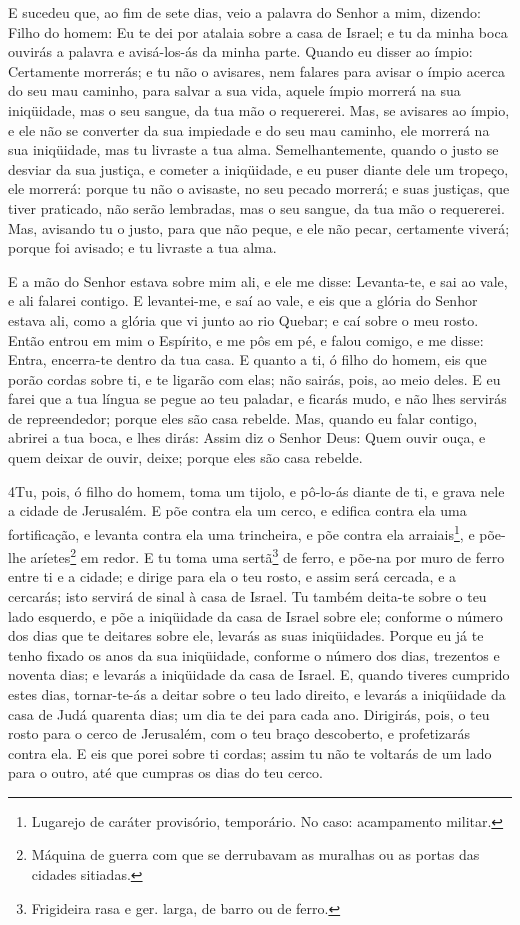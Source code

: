 E sucedeu que, ao fim de sete dias, veio a palavra do Senhor a
mim, dizendo: Filho do homem: Eu te dei por atalaia sobre a
casa de Israel; e tu da minha boca ouvirás a palavra e avisá-los-ás
da minha parte. Quando eu disser ao ímpio: Certamente
morrerás; e tu não o avisares, nem falares para avisar o ímpio
acerca do seu mau caminho, para salvar a sua vida, aquele ímpio
morrerá na sua iniqüidade, mas o seu sangue, da tua mão o
requererei. Mas, se avisares ao ímpio, e ele não se converter
da sua impiedade e do seu mau caminho, ele morrerá na sua
iniqüidade, mas tu livraste a tua alma. Semelhantemente,
quando o justo se desviar da sua justiça, e cometer a iniqüidade, e
eu puser diante dele um tropeço, ele morrerá: porque tu não o
avisaste, no seu pecado morrerá; e suas justiças, que tiver
praticado, não serão lembradas, mas o seu sangue, da tua mão o
requererei. Mas, avisando tu o justo, para que não peque, e
ele não pecar, certamente viverá; porque foi avisado; e tu livraste
a tua alma.

E a mão do Senhor estava sobre mim ali, e ele me disse:
Levanta-te, e sai ao vale, e ali falarei contigo. E
levantei-me, e saí ao vale, e eis que a glória do Senhor estava ali,
como a glória que vi junto ao rio Quebar; e caí sobre o meu rosto.
Então entrou em mim o Espírito, e me pôs em pé, e falou
comigo, e me disse: Entra, encerra-te dentro da tua casa. E
quanto a ti, ó filho do homem, eis que porão cordas sobre ti, e te
ligarão com elas; não sairás, pois, ao meio deles. E eu farei
que a tua língua se pegue ao teu paladar, e ficarás mudo, e não lhes
servirás de repreendedor; porque eles são casa rebelde. Mas,
quando eu falar contigo, abrirei a tua boca, e lhes dirás: Assim diz
o Senhor Deus: Quem ouvir ouça, e quem deixar de ouvir, deixe;
porque eles são casa rebelde.

\medskip

\lettrine{4} Tu, pois, ó filho do homem, toma um tijolo, e
pô-lo-ás diante de ti, e grava nele a cidade de Jerusalém. E põe
contra ela um cerco, e edifica contra ela uma fortificação, e
levanta contra ela uma trincheira, e põe contra ela
arraiais\footnote{Lugarejo de caráter provisório, temporário. No
caso: acampamento militar.}, e põe-lhe aríetes\footnote{Máquina de
guerra com que se derrubavam as muralhas ou as portas das cidades
sitiadas.} em redor. E tu toma uma sertã\footnote{Frigideira
rasa e ger. larga, de barro ou de ferro.} de ferro, e põe-na por
muro de ferro entre ti e a cidade; e dirige para ela o teu rosto, e
assim será cercada, e a cercarás; isto servirá de sinal à casa de
Israel. Tu também deita-te sobre o teu lado esquerdo, e põe a
iniqüidade da casa de Israel sobre ele; conforme o número dos dias
que te deitares sobre ele, levarás as suas iniqüidades. Porque
eu já te tenho fixado os anos da sua iniqüidade, conforme o número
dos dias, trezentos e noventa dias; e levarás a iniqüidade da casa
de Israel. E, quando tiveres cumprido estes dias, tornar-te-ás a
deitar sobre o teu lado direito, e levarás a iniqüidade da casa de
Judá quarenta dias; um dia te dei para cada ano. Dirigirás,
pois, o teu rosto para o cerco de Jerusalém, com o teu braço
descoberto, e profetizarás contra ela. E eis que porei sobre ti
cordas; assim tu não te voltarás de um lado para o outro, até que
cumpras os dias do teu cerco.

